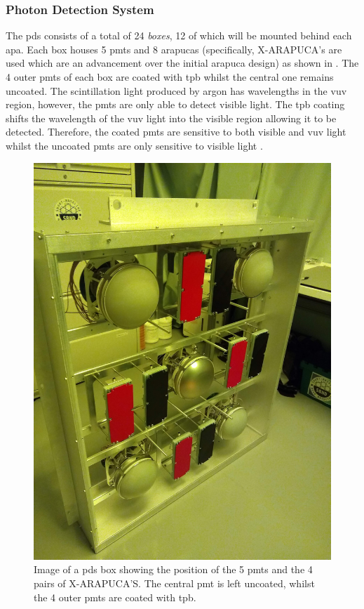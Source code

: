 \newpage
\subsubsection*{Photon Detection System}
The \gls{pds} consists of a total of 24 \textit{boxes}, 12 of which will be mounted behind each \gls{apa}. Each box houses 5 \glspl{pmt} and 8 \glspl{arapuca} (specifically, X-ARAPUCA's are used which are an advancement over the initial \gls{arapuca} design) as shown in . The 4 outer \glspl{pmt} of each box are coated with \gls{tpb} whilst the central one remains uncoated. The scintillation light produced by argon has wavelengths in the \gls{vuv} region, however, the \glspl{pmt} are only able to detect visible light. The \gls{tpb} coating shifts the wavelength of the \gls{vuv} light into the visible region allowing it to be detected. Therefore, the coated \glspl{pmt} are sensitive to both visible and \gls{vuv} light whilst the uncoated \glspl{pmt} are only sensitive to visible light \cite{LArTPC_review}. 

\begin{figure}[!h]
	\centering
	\includegraphics[width = \mediumfigwidth]{figures-chap3/PDS_box_2.jpg}
	\caption[Image of PDS box.]{Image of a \gls{pds} box showing the position of the 5 \glspl{pmt} and the 4 pairs of X-ARAPUCA'S. The central \gls{pmt} is left uncoated, whilst the 4 outer \glspl{pmt} are coated with \gls{tpb}.} %
\label{fig:pds_box}
\end{figure}

